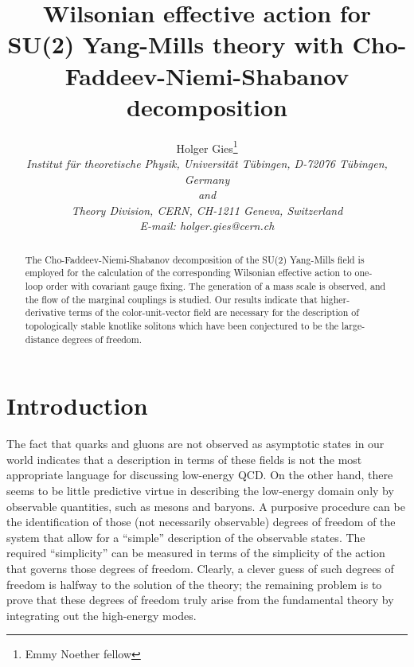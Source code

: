 \documentclass[a4paper,12pt]{article}
\begin{document}
\providecommand{\meff}{m_{\text{eff}}}
\providecommand{\Geff}{\Gamma_{\text{eff}}}
\providecommand{\Leff}{{\cal L}_{\text{eff}}}
\providecommand{\mn}{\mathbf{n}}
\providecommand{\mW}{\mathbf{W}}
\providecommand{\mA}{\mathbf{A}}
\providecommand{\mQ}{\mathbf{Q}}
\providecommand{\mK}{\mathbf{K}^{\!\mW}}
\providecommand{\mX}{\boldsymbol{\chi}}
\providecommand{\mF}{\boldsymbol{\phi}}
\providecommand{\case}[2]{{\scriptstyle \frac{#1}{#2}}}
\unitlength=1mm
\title{\bf Wilsonian effective action for SU(2) Yang-Mills theory with
  Cho-Faddeev-Niemi-Shabanov decomposition} 
\author{Holger Gies\thanks{Emmy Noether fellow}\\
  \small\it Institut f\"ur theoretische Physik, Universit\"at T\"ubingen,
  D-72076 T\"ubingen, Germany\\
  \small\it and\\
  \small\it Theory Division, CERN, CH-1211 Geneva, Switzerland\\
  \small\it E-mail: holger.gies@cern.ch }
\maketitle
\begin{abstract}
  The Cho-Faddeev-Niemi-Shabanov decomposition of the SU(2) Yang-Mills
  field is employed for the calculation of the corresponding Wilsonian
  effective action to one-loop order with covariant gauge fixing. The
  generation of a mass scale is observed, and the flow of the marginal
  couplings is studied. Our results indicate that higher-derivative
  terms of the color-unit-vector \coordHE{} field are necessary for
  the description of topologically stable knotlike solitons which
  have been conjectured to be the large-distance degrees of freedom.
\end{abstract}

\section{Introduction}
The fact that quarks and gluons are not observed as asymptotic states
in our world indicates that a description in terms of these fields
is not the most appropriate language for discussing
low-energy QCD. On the other hand, there seems to be little predictive
virtue in describing the low-energy domain only by observable
quantities, such as mesons and baryons. A purposive procedure can be
the identification of those (not necessarily observable) degrees of
freedom of the system that allow for a ``simple'' description of the
observable states. The required ``simplicity'' can be measured in
terms of the simplicity of the action that governs those degrees of
freedom. Clearly, a clever guess of such degrees of freedom is halfway
to the solution of the theory; the remaining problem is to prove that
these degrees of freedom truly arise from the fundamental theory by
integrating out the high-energy modes.
\end{document}
